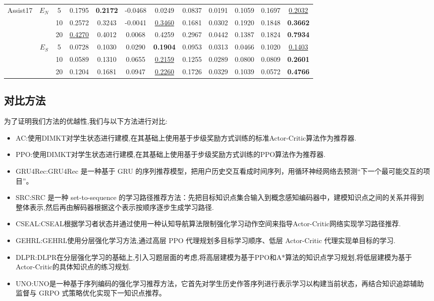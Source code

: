 \documentclass[UTF8,a4paper,zihao=5,twocolumn]{ctexart}
\begin{document}
\begin{table}[t]
{\begin{tabular}{cccccccccccc}
\midrule
\multirow[c]{6}{*}{Assist17} & \multirow[c]{3}{*}{$E_N$} & 5  & 0.1795 & \textbf{0.2172} & -0.0468 & 0.0249 & 0.0837 & 0.0191 & 0.1059 & 0.1697 & \underline{0.2032} \\
 &  & 10 & 0.2572 & 0.3243 & -0.0041 & \underline{0.3460} & 0.1681 & 0.0302 & 0.1920 & 0.1848 & \textbf{0.3662} \\
 &  & 20 & \underline{0.4270} & 0.4012 & 0.0068 & 0.4259 & 0.2967 & 0.0442 & 0.1387 & 0.1824 & \textbf{0.7934} \\
\cmidrule(lr){2-12}
 & \multirow[c]{3}{*}{$E_S$} & 5  & 0.0728 & 0.1030 & 0.0290 & \textbf{0.1904} & 0.0953 & 0.0313 & 0.0466 & 0.1020 & \underline{0.1403} \\
 &  & 10 & 0.0589 & 0.1310 & 0.0655 & \underline{0.2159} & 0.1255 & 0.0289 & 0.0800 & 0.0809 & \textbf{0.2601} \\
 &  & 20 & 0.1204 & 0.1681 & 0.0947 & \underline{0.2260} & 0.1726 & 0.0329 & 0.1039 & 0.0572 & \textbf{0.4766} \\
\bottomrule
\end{tabular}
}
\end{table}

\subsection{对比方法}

为了证明我们方法的优越性,我们与以下方法进行对比:
\begin{itemize}
\item AC:使用DIMKT对学生状态进行建模,在其基础上使用基于步级奖励方式训练的标准Actor-Critic算法作为推荐器\cite{SutMS1999}.
\item PPO:使用DIMKT对学生状态进行建模,在其基础上使用基于步级奖励方式训练的PPO算法作为推荐器\cite{SchWD2017}.
\item GRU4Rec:GRU4Rec 是一种基于 GRU 的序列推荐模型，把用户历史交互看成时间序列，用循环神经网络去预测“下一个最可能交互的项目”\cite{HidKB2015}。
\item SRC:SRC 是一种 set-to-sequence 的学习路径推荐方法：先把目标知识点集合输入到概念感知编码器中，建模知识点之间的关系并得到整体表示,然后再由解码器根据这个表示按顺序逐步生成学习路径\cite{CheSX2023}.
\item CSEAL:CSEAL根据学习者状态并通过使用一种认知导航算法限制强化学习动作空间来指导Actor-Critic网络实现学习路径推荐\cite{LiuTL2019}.
\item GEHRL:GEHRL使用分层强化学习方法,通过高层 PPO 代理规划多目标学习顺序、低层 Actor-Critic 代理实现单目标的学习\cite{LiXY2023}.
\item DLPR:DLPR在分层强化学习的基础上,引入习题层面的考虑,将高层建模为基于PPO和A*算法的知识点学习规划,将低层建模为基于Actor-Critic的具体知识点的练习规划\cite{ZhaSX2024}.
\item UNO:UNO是一种基于序列编码的强化学习推荐方法，它首先对学生历史作答序列进行表示学习以构建当前状态，再结合知识追踪辅助监督与 GRPO 式策略优化实现下一知识点推荐\cite{PenZC2026}。
\end{itemize}
\end{document}
